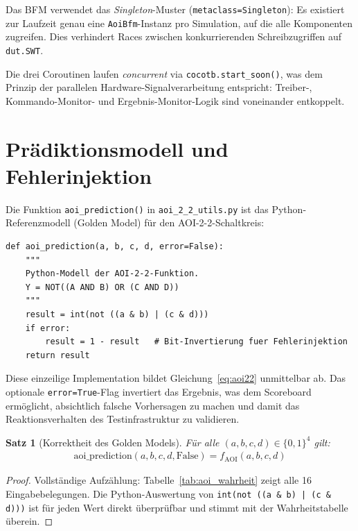 ﻿\documentclass[12pt,a4paper]{report}
\newtheorem{theorem}{Satz}[section]
\begin{document}
Das BFM verwendet das \emph{Singleton}-Muster
(\texttt{metaclass=Singleton}): Es existiert zur Laufzeit genau eine
\texttt{AoiBfm}-Instanz pro Simulation, auf die alle Komponenten zugreifen.
Dies verhindert Races zwischen konkurrierenden Schreibzugriffen auf
\texttt{dut.SWT}.

Die drei Coroutinen laufen \emph{concurrent} via \texttt{cocotb.start\_soon()},
was dem Prinzip der parallelen Hardware-Signalverarbeitung entspricht: Treiber-,
Kommando-Monitor- und Ergebnis-Monitor-Logik sind voneinander entkoppelt.

\section{Prädiktionsmodell und Fehlerinjektion}
\label{subsec:praediktion}

Die Funktion \texttt{aoi\_prediction()} in \texttt{aoi\_2\_2\_utils.py} ist
das Python-Referenzmodell (Golden Model) für den AOI-2-2-Schaltkreis:

\begin{lstlisting}[style=pythonstyle, caption={Golden Model: \texttt{aoi\_prediction()}}]
def aoi_prediction(a, b, c, d, error=False):
    """
    Python-Modell der AOI-2-2-Funktion.
    Y = NOT((A AND B) OR (C AND D))
    """
    result = int(not ((a & b) | (c & d)))
    if error:
        result = 1 - result   # Bit-Invertierung fuer Fehlerinjektion
    return result
\end{lstlisting}

Diese einzeilige Implementation bildet Gleichung~\ref{eq:aoi22} unmittelbar
ab. Das optionale \texttt{error=True}-Flag invertiert das Ergebnis, was dem
Scoreboard ermöglicht, absichtlich falsche Vorhersagen zu machen und damit
das Reaktionsverhalten des Testinfrastruktur zu validieren.

\begin{theorem}[Korrektheit des Golden Models]
\label{thm:golden_model}
Für alle $(a,b,c,d) \in \{0,1\}^4$ gilt:
\begin{align}
	\mathrm{aoi\_prediction}(a,b,c,d,\mathrm{False}) = f_{\mathrm{AOI}}(a,b,c,d)
\end{align}
\end{theorem}

\begin{proof}
Vollständige Aufzählung: Tabelle~\ref{tab:aoi_wahrheit} zeigt alle 16
Eingabebelegungen. Die Python-Auswertung von
\texttt{int(not ((a \& b) | (c \& d)))} ist für jeden Wert direkt
über\-prüfbar und stimmt mit der Wahrheitstabelle überein.
\end{proof}
\end{document}
